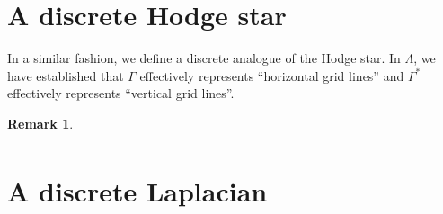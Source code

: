 \documentclass[aps,pra,showpacs,notitlepage,onecolumn,superscriptaddress,nofootinbib]{revtex4-1}
\theoremstyle{definition}
\newtheorem{remark}{Remark}[section]
\newtheorem{claim}{Claim}[section]
\begin{document}

\section{A discrete Hodge star}

\noindent In a similar fashion, we define a discrete analogue of the Hodge star. In $\Lambda$, we have established that $\Gamma$ effectively represents ``horizontal grid lines''
and $\Gamma^{*}$ effectively represents ``vertical grid lines''.

\begin{remark}
  \begin{align}
    
    \end{align}
  \end{remark}

\section{A discrete Laplacian}

\noindent 
\end{document}
